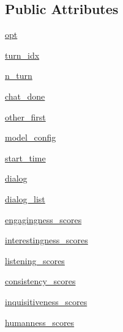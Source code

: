\subsection*{Public Attributes}
\begin{DoxyCompactItemize}
\item 
\hyperlink{classmturk_1_1worlds_1_1ControllableDialogEval_acdc5ce48bdc92b72461ea2e9bfa613f8}{opt}
\item 
\hyperlink{classmturk_1_1worlds_1_1ControllableDialogEval_a5564869f4fc317c0edbbe6bfa87cb5ac}{turn\+\_\+idx}
\item 
\hyperlink{classmturk_1_1worlds_1_1ControllableDialogEval_af9427766070562442866fc31ad073c4a}{n\+\_\+turn}
\item 
\hyperlink{classmturk_1_1worlds_1_1ControllableDialogEval_a7f2ec9cd6bedaed1d6f1c6a69741bc40}{chat\+\_\+done}
\item 
\hyperlink{classmturk_1_1worlds_1_1ControllableDialogEval_a8c727f9fdc38d27feb904f375805639e}{other\+\_\+first}
\item 
\hyperlink{classmturk_1_1worlds_1_1ControllableDialogEval_a91067ef43ba1d7c14772db400ed7dffa}{model\+\_\+config}
\item 
\hyperlink{classmturk_1_1worlds_1_1ControllableDialogEval_a569cc451b31da0c7fa50cd11eb973ef7}{start\+\_\+time}
\item 
\hyperlink{classmturk_1_1worlds_1_1ControllableDialogEval_a6db846b4fe4568a4cccfea506c2b326a}{dialog}
\item 
\hyperlink{classmturk_1_1worlds_1_1ControllableDialogEval_aa7c784a886c4770c8d3697d6750c628e}{dialog\+\_\+list}
\item 
\hyperlink{classmturk_1_1worlds_1_1ControllableDialogEval_ab15f7eda8d529d6e986c5cd6b8a1a74c}{engagingness\+\_\+scores}
\item 
\hyperlink{classmturk_1_1worlds_1_1ControllableDialogEval_ab2eab4776e5ff8d98d1c1949d498056e}{interestingness\+\_\+scores}
\item 
\hyperlink{classmturk_1_1worlds_1_1ControllableDialogEval_aadcb4315330df6fe6579fee32686e7be}{listening\+\_\+scores}
\item 
\hyperlink{classmturk_1_1worlds_1_1ControllableDialogEval_a6dfb33d2a7fdacbe865dcd9e3a9f69e6}{consistency\+\_\+scores}
\item 
\hyperlink{classmturk_1_1worlds_1_1ControllableDialogEval_af3c55c756120ebb769b936259a8f59eb}{inquisitiveness\+\_\+scores}
\item 
\hyperlink{classmturk_1_1worlds_1_1ControllableDialogEval_a941e7fc113c8974d3c504fc55f1d51a6}{humanness\+\_\+scores}

\end{DoxyCompactItemize}
